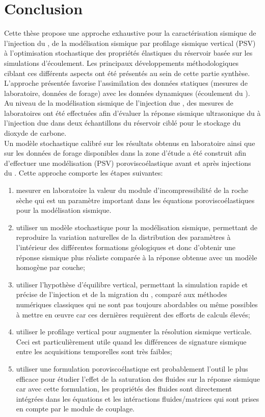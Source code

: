 \chapter{Conclusion}
Cette thèse propose une approche exhaustive pour la caractérisation sismique de
l'injection du , de la modélisation sismique par profilage sismique
vertical (PSV) à l'optimisation stochastique des propriétés élastiques du
réservoir basée sur les simulations d'écoulement. Les principaux développements
méthodologiques ciblant ces différents aspects ont été présentés au sein de
cette partie synthèse. L'approche présentée favorise l'assimilation des données
statiques (mesures de laboratoire, données de forage) avec les données dynamiques
(écoulement du ).\\

Au niveau de la modélisation sismique de l'injection due , des mesures de
laboratoires ont été effectuées afin d'évaluer la réponse sismique ultrasonique du
à l'injection due  dans deux échantillons du réservoir ciblé pour le
stockage du dioxyde de carbone. \\
Un modèle stochastique calibré sur les résultats obtenus en laboratoire ainsi
que sur les données de forage disponibles dans la zone d'étude a été construit
afin d'effectuer une modélisation (PSV) poroviscoélastique avant et après
injections du . Cette approche comporte les étapes suivantes:
\begin{enumerate}[-]
\item  mesurer en laboratoire la valeur du module d'incompressibilité de la roche sèche qui est un
paramètre important dans les équations poroviscoélastiques pour la modélisation
sismique.
\item utiliser un modèle stochastique pour la modélisation sismique, permettant de
reproduire la variation naturelles de la distribution des paramètres à
l’intérieur des différentes formations géologiques et donc d'obtenir une réponse
sismique plus réaliste comparée à la réponse obtenue avec un modèle homogène par
couche;
\item utiliser l'hypothèse d'équilibre vertical, permettant la simulation rapide et
précise de l'injection et de la migration du , comparé aux méthodes
numériques classiques qui ne sont pas toujours abordables ou même possibles à
mettre en œuvre car ces dernières requièrent des efforts de calculs élevés;
\item utiliser le profilage vertical pour augmenter la résolution sismique
verticale. Ceci est particulièrement utile quand les différences de signature sismique entre les
acquisitions temporelles sont très faibles;
\item utiliser une formulation poroviscoélastique est probablement l'outil le plus
efficace pour étudier l'effet de la saturation des fluides sur la réponse
sismique car avec cette formulation, les propriétés des fluides sont directement
intégrées dans les équations et les intéractions fluides/matrices qui sont prises en compte par le module de couplage.
\end{enumerate}

